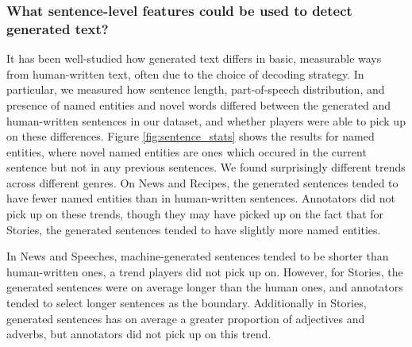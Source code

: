 \subsubsection{What sentence-level features could be used to detect generated text?}
It has been well-studied how generated text differs in basic, measurable ways from human-written text, often due to the choice of decoding strategy.
In particular, we measured how sentence length, part-of-speech distribution, and presence of named entities and novel words differed between the generated and human-written sentences in our dataset, and whether players were able to pick up on these differences.
Figure \ref{fig:sentence_stats} shows the results for named entities, where novel named entities are ones which occured in the current sentence but not in any previous sentences.
We found surprisingly different trends across different genres.
On News and Recipes, the generated sentences tended to have fewer named entities than in human-written sentences.
Annotators did not pick up on these trends, though they may have picked up on the fact that for Stories, the generated sentences tended to have slightly more named entities.

In News and Speeches, machine-generated sentences tended to be shorter than human-written ones, a trend players did not pick up on.
However, for Stories, the generated sentences were on average longer than the human ones, and annotators tended to select longer sentences as the boundary.
Additionally in Stories, generated sentences has on average a greater proportion of adjectives and adverbs, but annotators did not pick up on this trend.



